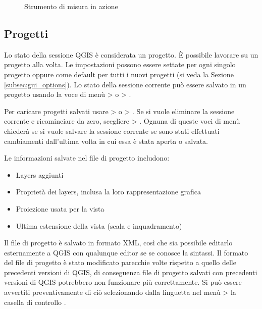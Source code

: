 \begin{figure}[h]
\caption{Strumento di misura in azione \nixcaption} \label{fig:measure}
\centering
   \goodgap
\end{figure}

\subsection{Progetti}\label{sec:projects}

Lo stato della sessione QGIS è considerata un progetto. È possibile lavorare
su un
progetto alla volta. Le impostazioni possono essere settate per ogni singolo
progetto oppure come default per tutti i nuovi progetti (si veda la Sezione
\ref{subsec:gui_options}). Lo stato della sessione corrente può essere salvato
in un progetto usando la voce di menù  >
o  > .

Per caricare progetti salvati usare  >
o  > .
Se si vuole eliminare la sessione corrente e ricominciare da zero, scegliere
 > .
Ognuna di queste voci di menù chiederà se si vuole salvare la sessione
corrente se sono stati effettuati cambiamenti dall'ultima volta in cui essa è
stata aperta o salvata.

Le informazioni salvate nel file di progetto includono:

\begin{itemize}
\item Layers aggiunti
\item Proprietà dei layers, inclusa la loro rappresentazione grafica
\item Proiezione usata per la vista
\item Ultima estensione della vista (scala e inquadramento)
\end{itemize}

Il file di progetto è salvato in formato XML, così che sia possibile editarlo
esternamente a QGIS con qualunque editor se se conosce la sintassi. Il formato
del file di progetto è stato modificato parecchie volte rispetto a quello
delle precedenti versioni di QGIS, di conseguenza file di progetto salvati con
precedenti versioni di QGIS potrebbero non funzionare più correttamente. Si
può essere avvertiti preventivamente di ciò selezionando dalla linguetta
 nel menù  >  
la casella di controllo .

